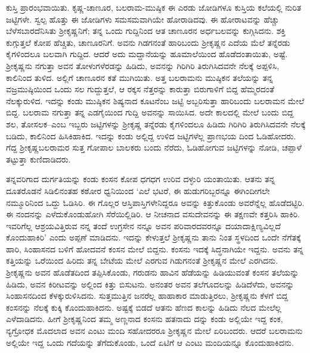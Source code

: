 ಕುಸ್ತಿ ಪ್ರಾರಂಭವಾಯಿತು. ಕೃಷ್ಣ-ಚಾಣೂರ, ಬಲರಾಮ-ಮುಷ್ಠಿಕ ಈ ಎರಡು ಜೋಡಿಗಳೂ ಕುಸ್ತಿಯ ಕಲೆಯಲ್ಲಿ ನುರಿತ ಜಟ್ಟಿಗಳೇ. ಸ್ವಲ್ಪ ಹೊತ್ತು ಈ ಜೋಡಿಗಳು ಸಮಸಮವಾಗಿಯೇ ಹೋರಾಡಿದವು. ಈ ಹೋರಾಟವನ್ನು ಹೆಚ್ಚು ಬೆಳೆಸಬಾರದೆನಿಸಿತು ಶ್ರೀಕೃಷ್ಣನಿಗೆ; ತನ್ನ ಒಂದು ಗುದ್ದಿನಿಂದ ಆತ ಚಾಣೂರನ ಅರ್ಧಬಲವನ್ನು ಕುಗ್ಗಿಸಿದನು. ಶಕ್ತಿ ಕುಗ್ಗುತ್ತಲೆ ಕೋಪ ಹೆಚ್ಚಿತು, ಚಾಣೂರನಿಗೆ. ಅವನು ಗಿಡಗನಂತೆ ಹಾರಿಬಂದು ಶ್ರೀಕೃಷ್ಣನ ಎದೆಯ ಮೆಲೆ ತನ್ನೆರಡು ಕೈಗಳಿಂದಲೂ ಬಲವಾಗಿ ಗುದ್ದಿದ. ಆದರೆ ಅದು ಮದ್ದಾನೆಯನ್ನು ಹೂಮಾಲೆಯಿಂದ ಹೊಡೆದಂತಾಯಿತು, ಅಷ್ಟೆ. ಶ್ರೀಕೃಷ್ಣನು ನಗುತ್ತಾ ಅವನ ತೋಳುಗಳೆರಡನ್ನು ಹಿಡಿದು, ಅವನನ್ನು ಗಿರಿಗಿರಿ ತಿರುಗಿಸಿದವನೇ ನೆಲಕ್ಕೆ ಅಪ್ಪಳಿಸಿ, ಕಾಲಿನಿಂದ ತುಳಿದ. ಅಲ್ಲಿಗೆ ಚಾಣೂರನ ಕತೆ ಮುಗಿಯಿತು. ಅತ್ತ ಬಲರಾಮನು ಮುಷ್ಠಿಕನ ತಲೆಯನ್ನು ತನ್ನ ವಜ್ರಮುಷ್ಠಿಯಿಂದ ಒಂದು ಸಲ ಗುದ್ದುತ್ತಲೆ, ಆ ರಕ್ಕಸ ನೆತ್ತರನ್ನು ಕಾರುತ್ತಾ ಬಿರುಗಾಳಿಗೆ ಬಿದ್ದ ಹೆಮ್ಮರದಂತೆ ನೆಲಕ್ಕುರುಳಿದ. ಇದನ್ನು ಕಂಡು ಮುಷ್ಠಿಕನ ಶಿಷ್ಯನಾದ ಕೂಟನೆಂಬ ಜಟ್ಟಿ ಅಬ್ಬರಿಸುತ್ತಾ ಹಾರಿಬಂದು ಬಲರಾಮನ ಮೇಲೆ ಬಿದ್ದ. ಬಲರಾಮ ನಗುತ್ತಾ ತನ್ನ ಎಡಗೈಯಿಂದ ಗುದ್ದಿ ಅವನನ್ನು ಸಾಯಿಸಿದ. ಅದೇ ಕಾಲದಲ್ಲಿ ಮೇಲೆ ಬಂದು ಬಿದ್ದ ಶಲ, ತೋಸಲಕ–ಎಂಬ ಇಬ್ಬರು ಜಟ್ಟಿಗಳನ್ನು ಶ್ರೀಕೃಷ್ಣ ತನ್ನೆರಡು ಕೈಗಳಿಂದಲೂ ಹಿಡಿದು ಗಿರಿಗಿರಿ ತಿರುಗಿಸಿದವನೇ ನೆಲಕ್ಕೆ ಬಡಿದು, ಕಾಲಿನಿಂದ ಹಿಸಿಕಿಹಾಕಿದ. ಇದನ್ನು ಕಂಡು ಅಲ್ಲಿದ್ದ ಉಳಿದ ಜಟ್ಟಿಗಳೆಲ್ಲ ಪ್ರಾಣಭಯ ದಿಂದ ಓಡಿಹೋದರು. ಗೆದ್ದ ಶ್ರೀಕೃಷ್ಣಬಲರಾಮರ ಸುತ್ತ ಗೋಪಾಲ ಬಾಲಕರು ಬಂದು ನೆರೆದು, ಓಡಿಹೋಗುವ ಜಟ್ಟಿಗಳನ್ನು ನೋಡಿ, ಚಪ್ಪಾಳೆ ತಟ್ಟುತ್ತಾ ಕುಣಿದಾಡಿದರು.

ತನ್ನವರಿಗಾದ ದುರ್ಗತಿಯನ್ನು ಕಂಡು ಕಂಸನ ಕೋಪ ಧಗಧಗ ಉರಿವ ದಳ್ಳುರಿ ಯಂತಾಯಿತು. ಆತನು ತನ್ನ ದೂತರೊಡನೆ ಸಿಡಿಲಿನಂತಹ ಕಠೋರ ಧ್ವನಿಯಿಂದ ‘ಎಲೆ ಭಟರೆ, ಈ ಹುಡುಗರಿಬ್ಬರನ್ನೂ ಈಗಿಂದೀಗಲೇ ನಮ್ಮೂರಿನಿಂದ ಒದ್ದು ಓಡಿಸಿರಿ. ಈ ಗೊಲ್ಲರ ಆಸ್ತಿಪಾಸ್ತಿಗಳೇನಿದ್ದರೂ ಅವನ್ನು ಕಿತ್ತುಕೊಂಡು ಅವರೆನ್ನೆಲ್ಲ ಹೊಡೆದಟ್ಟಿರಿ. ಈ ನಂದನನ್ನು ಎಳೆದುಕೊಂಡುಹೋಗಿ ಸೆರೆಯಿಲ್ಲಿಡಿರಿ. ಆ ನೀಚನಾದ ವಸುದೇವನನ್ನು ಈ ತಕ್ಷಣವೇ ಕತ್ತರಿಸಿ ಹಾಕಿರಿ. ಇವರಿಗೆಲ್ಲ ಆಶ್ರಯವಿತ್ತಿರುವ ನನ್ನ ತಂದೆ ಉಗ್ರಸೇನ ನನ್ನೂ ಅವನ ಪರಿವಾರದವರನ್ನೂ ದಯಾದಾಕ್ಷಿಣ್ಯವಿಲ್ಲದೆ ಕೊಂದುಹಾಕಿರಿ’ ಎಂದು ಅಪ್ಪಣೆ ಮಾಡಿದನು. ಇದನ್ನು ಕೇಳುತ್ತಲೆ ಶ್ರೀಕೃಷ್ಣನು ತಾನು ನಿಂತ ಸ್ಥಳದಿಂದ ಒಂದೇ ನೆಗೆತಕ್ಕೆ ಹಾರಿ, ಸಿಂಹಾಸನದ ಬಳಿಗೆ ಹೋದವನೆ ಕಂಸನ ಮೇಲೆ ಬಿದ್ದನು. ಕಂಸನು ಇದಕ್ಕೆ ಸಿದ್ಧನಾಗಿಯೇ ಇದ್ದನು. ಅವನು ತನ್ನ ಕತ್ತಿಯನ್ನು ಒರೆಯಿಂದ ಹಿರಿದು ತನ್ನ ಬೇಟೆಯ ಮೇಲೆ ಎರಗುವ ಗಿಡುಗನಂತೆ ಶ್ರೀಕೃಷ್ಣನ ಮೇಲೆ ಎರಗಿದನು. ಶ್ರೀಕೃಷ್ಣನು ಅವನ ಹೊಡೆತದಿಂದ ತಪ್ಪಿಸಿಕೊಂಡು, ಗರುಡನು ಹಾವಿನ ಹೆಡೆಯನ್ನು ಹಿಡಿಯುವಂತೆ ಕಂಸನ ತಲೆಯನ್ನು ಹಿಡಿದು, ಅವನ ಕಿರೀಟವನ್ನು ಅಲ್ಲಿಂದ ಕಿತ್ತು ಬಿಸುಟನು. ಅನಂತರ ಅವನ ತಲೆಗೂದಲನ್ನು ಹಿಡಿದೆಳೆದು, ಅವನನ್ನು ಸಿಂಹಾಸನದಿಂದ ಕೆಳಕ್ಕುರುಳಿಸಿದನು. ಸುತ್ತಮುತ್ತಿನ ಜನರೆಲ್ಲ ಹಾಹಾಕಾರ ಮಾಡುತ್ತಿರಲು, ಶ್ರೀಕೃಷ್ಣನು ಕೆಳಗೆ ಬಿದ್ದ ಕಂಸನನ್ನು ನೆಲಕ್ಕೆ ಕುಕ್ಕಿ ಕೊಂದುಹಾಕಿದನು. ಅಷ್ಟಕ್ಕೆ ಬಿಡದೆ ಆತನು ಹೆಣದ ಕಾಲನ್ನು ಹಿಡಿದು ನೆಲದ ಮೇಲೆಲ್ಲ ಎಳೆದಾಡಿದನು. ಹೀಗೆ ಶ್ರೀಕೃಷ್ಣನಿಂದ ತಮ್ಮ ಅಣ್ಣನಾದ ಕಂಸನು ಹತನಾದು ದನ್ನು ಕಂಡು ಅಲ್ಲಿಯೇ ಇದ್ದ ಕಂಕ, ನ್ಯಗ್ರೋಧಕ ಮೊದಲಾದ ಅವನ ಎಂಟು ಮಂದಿ ಸಹೋದರರೂ ಶ್ರೀಕೃಷ್ಣನ ಮೇಲೆ ಏರಿಬಂದರು. ಆದರೆ ಬಲರಾಮನು ಅಲ್ಲಿಯೇ ಇದ್ದ ಒಂದು ಗದೆಯನ್ನು ತೆಗೆದುಕೊಂಡು, ಒಂದೆ ಏಟಿಗೆ ಆ ಎಂಟು ಮಂದಿಯನ್ನೂ ಕೊಂದುಹಾಕಿದನು.

